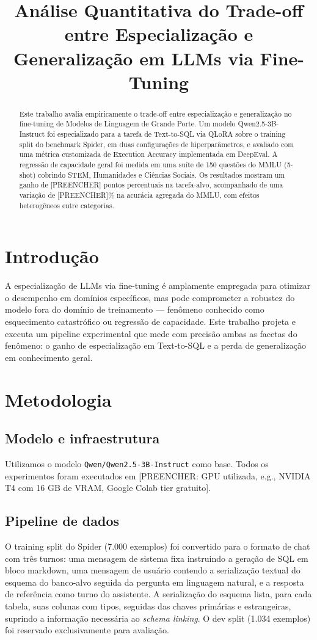 \documentclass[conference]{IEEEtran}
\title{Análise Quantitativa do Trade-off entre Especialização e
Generalização em LLMs via Fine-Tuning}
\author{\IEEEauthorblockN{[PREENCHER: Seu Nome]}
\IEEEauthorblockA{Instituto de Computação -- Universidade Federal do Amazonas\\
[PREENCHER: seu e-mail]}}
\begin{document}
\maketitle

\begin{abstract}
Este trabalho avalia empiricamente o trade-off entre especialização e
generalização no fine-tuning de Modelos de Linguagem de Grande Porte.
Um modelo Qwen2.5-3B-Instruct foi especializado para a tarefa de
Text-to-SQL via QLoRA sobre o training split do benchmark Spider, em
duas configurações de hiperparâmetros, e avaliado com uma métrica
customizada de Execution Accuracy implementada em DeepEval. A regressão
de capacidade geral foi medida em uma suíte de 150 questões do MMLU
(5-shot) cobrindo STEM, Humanidades e Ciências Sociais. Os resultados
mostram um ganho de [PREENCHER] pontos percentuais na tarefa-alvo,
acompanhado de uma variação de [PREENCHER]\% na acurácia agregada do
MMLU, com efeitos heterogêneos entre categorias.
\end{abstract}

\section{Introdução}
A especialização de LLMs via fine-tuning é amplamente empregada para
otimizar o desempenho em domínios específicos, mas pode comprometer a
robustez do modelo fora do domínio de treinamento --- fenômeno conhecido
como esquecimento catastrófico ou regressão de capacidade. Este trabalho
projeta e executa um pipeline experimental que mede com precisão ambas
as facetas do fenômeno: o ganho de especialização em Text-to-SQL e a
perda de generalização em conhecimento geral.

\section{Metodologia}

\subsection{Modelo e infraestrutura}
Utilizamos o modelo \texttt{Qwen/Qwen2.5-3B-Instruct} como base. Todos
os experimentos foram executados em [PREENCHER: GPU utilizada, e.g.,
NVIDIA T4 com 16 GB de VRAM, Google Colab tier gratuito].

\subsection{Pipeline de dados}
O training split do Spider (7.000 exemplos) foi convertido para o
formato de chat com três turnos: uma mensagem de sistema fixa instruindo
a geração de SQL em bloco markdown, uma mensagem de usuário contendo a
serialização textual do esquema do banco-alvo seguida da pergunta em
linguagem natural, e a resposta de referência como turno do assistente.
A serialização do esquema lista, para cada tabela, suas colunas com
tipos, seguidas das chaves primárias e estrangeiras, suprindo a
informação necessária ao \emph{schema linking}. O dev split (1.034
exemplos) foi reservado exclusivamente para avaliação.
\end{document}
